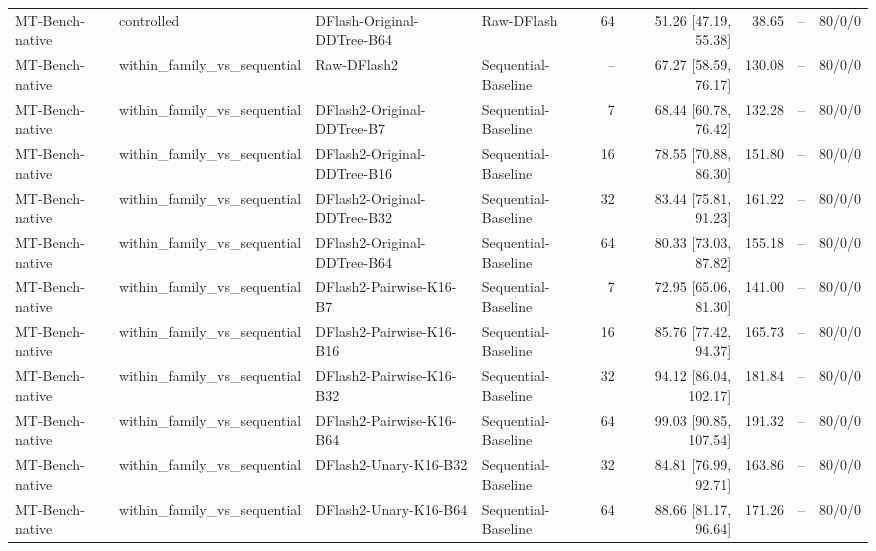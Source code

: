 \begin{longtable}{llllrrrrr}
MT-Bench-native & controlled & DFlash-Original-DDTree-B64 & Raw-DFlash & 64 & 51.26 [47.19, 55.38] & 38.65 & -- & 80/0/0 \\
MT-Bench-native & within\_family\_vs\_sequential & Raw-DFlash2 & Sequential-Baseline & -- & 67.27 [58.59, 76.17] & 130.08 & -- & 80/0/0 \\
MT-Bench-native & within\_family\_vs\_sequential & DFlash2-Original-DDTree-B7 & Sequential-Baseline & 7 & 68.44 [60.78, 76.42] & 132.28 & -- & 80/0/0 \\
MT-Bench-native & within\_family\_vs\_sequential & DFlash2-Original-DDTree-B16 & Sequential-Baseline & 16 & 78.55 [70.88, 86.30] & 151.80 & -- & 80/0/0 \\
MT-Bench-native & within\_family\_vs\_sequential & DFlash2-Original-DDTree-B32 & Sequential-Baseline & 32 & 83.44 [75.81, 91.23] & 161.22 & -- & 80/0/0 \\
MT-Bench-native & within\_family\_vs\_sequential & DFlash2-Original-DDTree-B64 & Sequential-Baseline & 64 & 80.33 [73.03, 87.82] & 155.18 & -- & 80/0/0 \\
MT-Bench-native & within\_family\_vs\_sequential & DFlash2-Pairwise-K16-B7 & Sequential-Baseline & 7 & 72.95 [65.06, 81.30] & 141.00 & -- & 80/0/0 \\
MT-Bench-native & within\_family\_vs\_sequential & DFlash2-Pairwise-K16-B16 & Sequential-Baseline & 16 & 85.76 [77.42, 94.37] & 165.73 & -- & 80/0/0 \\
MT-Bench-native & within\_family\_vs\_sequential & DFlash2-Pairwise-K16-B32 & Sequential-Baseline & 32 & 94.12 [86.04, 102.17] & 181.84 & -- & 80/0/0 \\
MT-Bench-native & within\_family\_vs\_sequential & DFlash2-Pairwise-K16-B64 & Sequential-Baseline & 64 & 99.03 [90.85, 107.54] & 191.32 & -- & 80/0/0 \\
MT-Bench-native & within\_family\_vs\_sequential & DFlash2-Unary-K16-B32 & Sequential-Baseline & 32 & 84.81 [76.99, 92.71] & 163.86 & -- & 80/0/0 \\
MT-Bench-native & within\_family\_vs\_sequential & DFlash2-Unary-K16-B64 & Sequential-Baseline & 64 & 88.66 [81.17, 96.64] & 171.26 & -- & 80/0/0 \\
\end{longtable}


